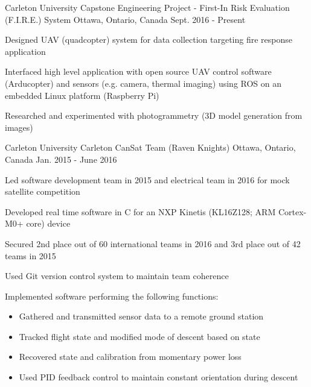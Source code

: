 

\begin{cventries}

  \cventry
    {Carleton University} %
    {Capstone Engineering Project - First-In Risk Evaluation (F.I.R.E.) System} %
    {Ottawa, Ontario, Canada} %
    {Sept. 2016 - Present} %
    {
      \begin{cvitems} %
        \item {Designed UAV (quadcopter) system for data collection targeting fire response application}
        \item {Interfaced high level application with open source UAV control software (Arducopter) and sensors (e.g. camera, thermal imaging) using ROS on an embedded Linux platform (Raspberry Pi)}
        \item {Researched and experimented with photogrammetry (3D model generation from images)}
      \end{cvitems}
    }

  \cventry
    {Carleton University} %
    {Carleton CanSat Team (Raven Knights)} %
    {Ottawa, Ontario, Canada} %
    {Jan. 2015 - June 2016} %
    {
      \begin{cvitems} %
        \item {Led software development team in 2015 and electrical team in 2016 for mock satellite competition}
        \item {Developed real time software in C for an NXP Kinetis (KL16Z128; ARM Cortex-M0+ core) device}
        \item {Secured 2nd place out of 60 international teams in 2016 and 3rd place out of 42 teams in 2015}
        \item {Used Git version control system to maintain team coherence}
        \item {Implemented software performing the following functions:}
        \begin{itemize}
          \item {Gathered and transmitted sensor data to a remote ground station}
          \item {Tracked flight state and modified mode of descent based on state}
          \item {Recovered state and calibration from momentary power loss}
          \item {Used PID feedback control to maintain constant orientation during descent}
        \end{itemize}
      \end{cvitems}
    }


\end{cventries}
